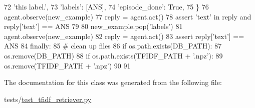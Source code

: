 \begin{DoxyCode}
72                 \textcolor{stringliteral}{'this label.'},
73                 \textcolor{stringliteral}{'labels'}: [ANS],
74                 \textcolor{stringliteral}{'episode\_done'}: \textcolor{keyword}{True},
75             \}
76             agent.observe(new\_example)
77             reply = agent.act()
78             \textcolor{keyword}{assert} \textcolor{stringliteral}{'text'} \textcolor{keywordflow}{in} reply \textcolor{keywordflow}{and} reply[\textcolor{stringliteral}{'text'}] == ANS
79 
80             new\_example.pop(\textcolor{stringliteral}{'labels'})
81             agent.observe(new\_example)
82             reply = agent.act()
83             \textcolor{keyword}{assert} reply[\textcolor{stringliteral}{'text'}] == ANS
84         \textcolor{keywordflow}{finally}:
85             \textcolor{comment}{# clean up files}
86             \textcolor{keywordflow}{if} os.path.exists(DB\_PATH):
87                 os.remove(DB\_PATH)
88             \textcolor{keywordflow}{if} os.path.exists(TFIDF\_PATH + \textcolor{stringliteral}{'.npz'}):
89                 os.remove(TFIDF\_PATH + \textcolor{stringliteral}{'.npz'})
90 
91 
\end{DoxyCode}


The documentation for this class was generated from the following file\+:\begin{DoxyCompactItemize}
\item 
tests/\hyperlink{test__tfidf__retriever_8py}{test\+\_\+tfidf\+\_\+retriever.\+py}\end{DoxyCompactItemize}
